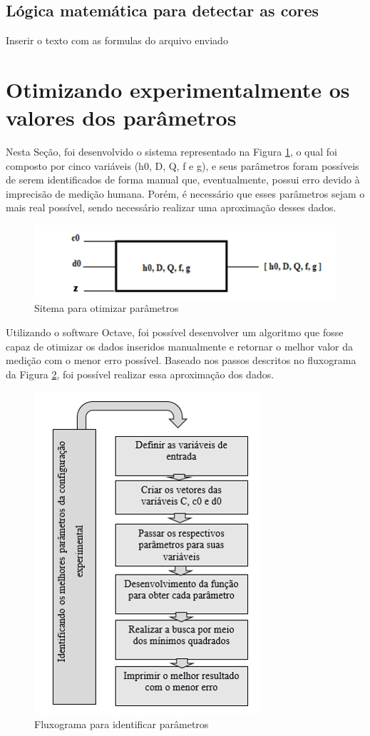 \documentclass[a4paper, 12pt]{article}
\begin{document}
\subsection{Lógica matemática para detectar as cores}

Inserir o texto com as formulas do arquivo enviado


\section{Otimizando experimentalmente os valores dos parâmetros}
Nesta Seção, foi desenvolvido o sistema representado na Figura \ref{sitema_otimizacao}, o qual foi composto por cinco variáveis (h0, D, Q, f e g), e seus parâmetros foram possíveis de serem identificados de forma manual que, eventualmente, possui erro devido à imprecisão de medição humana. Porém, é necessário que esses parâmetros sejam o mais real possível, sendo necessário realizar uma aproximação desses dados.

\begin{figure}[H]
	\centering
		\includegraphics[width=.55\linewidth]{sitema_otimizacao.png}
	\caption{Sitema para otimizar parâmetros}
	\label{sitema_otimizacao}
\end{figure}

Utilizando o software Octave, foi possível desenvolver um algoritmo que fosse capaz de otimizar os dados inseridos manualmente e retornar o melhor valor da medição com o menor erro possível. Baseado nos passos descritos no fluxograma da Figura \ref{identificar parametros}, foi possível realizar essa aproximação dos dados.


\begin{figure}[H]
	\centering
		\includegraphics[width=.55\linewidth]{fluxograma_identificar_parametros.png}
	\caption{Fluxograma para identificar parâmetros}
	\label{identificar parametros}
\end{figure}
\end{document}

